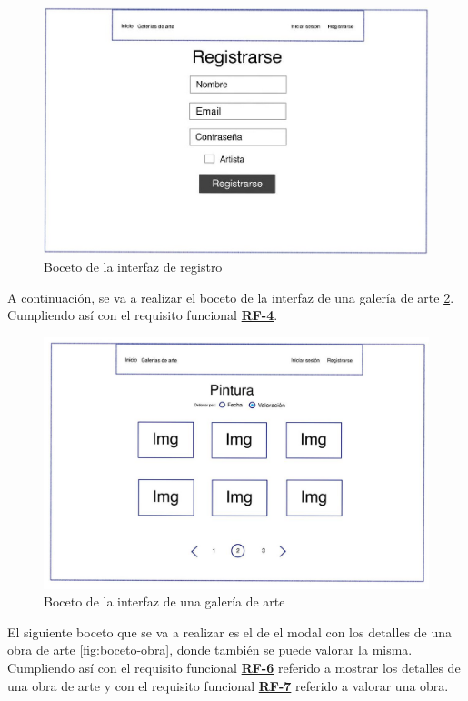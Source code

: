 \begin{figure}[H]
  \centering
  \includegraphics[width=\textwidth]{img/registrarse}
  \caption{Boceto de la interfaz de registro}
  \label{fig:boceto-registro}
\end{figure}

\newpage

A continuación, se va a realizar el boceto de la interfaz de una galería de arte
\ref{fig:boceto-galeria}. Cumpliendo así con el requisito funcional
\hyperref[tab:rf-4]{\textbf{RF-4}}.

\begin{figure}[H]
  \centering
  \includegraphics[width=\textwidth]{img/galeria}
  \caption{Boceto de la interfaz de una galería de arte}
  \label{fig:boceto-galeria}
\end{figure}

\newpage

El siguiente boceto que se va a realizar es el de el modal con los detalles de una obra de
arte \ref{fig:boceto-obra}, donde también se puede valorar la misma. Cumpliendo así con el
requisito funcional \hyperref[tab:rf-6]{\textbf{RF-6}} referido a mostrar los detalles de una
obra de arte y con el requisito funcional \hyperref[tab:rf-7]{\textbf{RF-7}} referido a
valorar una obra.

